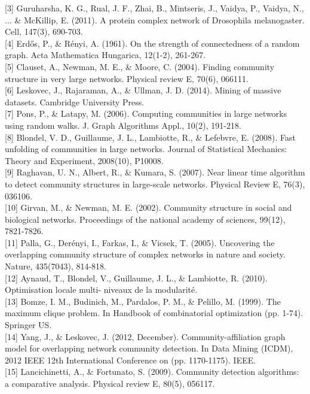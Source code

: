 \documentclass[10pt]{article}
\begin{document}
[3] Guruharsha, K. G., Rual, J. F., Zhai, B., Mintseris, J., Vaidya, P., Vaidya, N., ... & McKillip, E. (2011). A protein complex network of Drosophila melanogaster. Cell, 147(3), 690-703. \\

[4] Erdős, P., & Rényi, A. (1961). On the strength of connectedness of a random graph. Acta Mathematica Hungarica, 12(1-2), 261-267. \\

[5] Clauset, A., Newman, M. E., & Moore, C. (2004). Finding community structure in very large networks. Physical review E, 70(6), 066111. \\

[6] Leskovec, J., Rajaraman, A., & Ullman, J. D. (2014). Mining of massive datasets. Cambridge University Press. \\

[7] Pons, P., & Latapy, M. (2006). Computing communities in large networks using random walks. J. Graph Algorithms Appl., 10(2), 191-218. \\

[8] Blondel, V. D., Guillaume, J. L., Lambiotte, R., & Lefebvre, E. (2008). Fast unfolding of communities in large networks. Journal of Statistical Mechanics: Theory and Experiment, 2008(10), P10008. \\ 

[9] Raghavan, U. N., Albert, R., & Kumara, S. (2007). Near linear time algorithm to detect community structures in large-scale networks. Physical Review E, 76(3), 036106. \\

[10] Girvan, M., & Newman, M. E. (2002). Community structure in social and biological networks. Proceedings of the national academy of sciences, 99(12), 7821-7826. \\

[11] Palla, G., Derényi, I., Farkas, I., & Vicsek, T. (2005). Uncovering the overlapping community structure of complex networks in nature and society. Nature, 435(7043), 814-818. \\

[12] Aynaud, T., Blondel, V., Guillaume, J. L., & Lambiotte, R. (2010). Optimisation locale multi- niveaux de la modularité. \\

[13] Bomze, I. M., Budinich, M., Pardalos, P. M., & Pelillo, M. (1999). The maximum clique problem. In Handbook of combinatorial optimization (pp. 1-74). Springer US. \\

[14] Yang, J., & Leskovec, J. (2012, December). Community-affiliation graph model for overlapping network community detection. In Data Mining (ICDM), 2012 IEEE 12th International Conference on (pp. 1170-1175). IEEE. \\

[15] Lancichinetti, A., & Fortunato, S. (2009). Community detection algorithms: a comparative analysis. Physical review E, 80(5), 056117. \\
\end{document}
